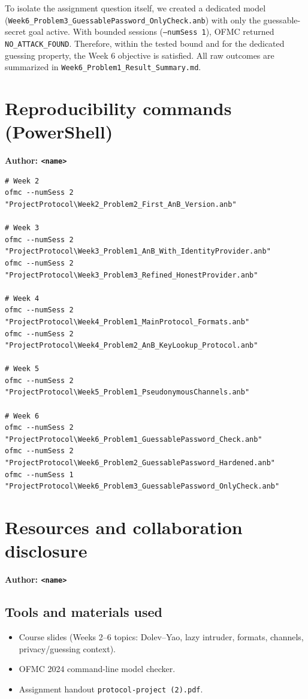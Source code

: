 \documentclass[11pt,a4paper]{article}
\begin{document}
To isolate the assignment question itself, we created a dedicated model
(\texttt{Week6\_Problem3\_GuessablePassword\_OnlyCheck.anb}) with only the guessable-secret goal active.
With bounded sessions (\texttt{--numSess 1}), OFMC returned \texttt{NO\_ATTACK\_FOUND}.
Therefore, within the tested bound and for the dedicated guessing property, the Week 6 objective is satisfied.
All raw outcomes are summarized in \texttt{Week6\_Problem1\_Result\_Summary.md}.

\section{Reproducibility commands (PowerShell)}
\textbf{Author: \texttt{<name>}}

\begin{lstlisting}
# Week 2
ofmc --numSess 2 "ProjectProtocol\Week2_Problem2_First_AnB_Version.anb"

# Week 3
ofmc --numSess 2 "ProjectProtocol\Week3_Problem1_AnB_With_IdentityProvider.anb"
ofmc --numSess 2 "ProjectProtocol\Week3_Problem3_Refined_HonestProvider.anb"

# Week 4
ofmc --numSess 2 "ProjectProtocol\Week4_Problem1_MainProtocol_Formats.anb"
ofmc --numSess 2 "ProjectProtocol\Week4_Problem2_AnB_KeyLookup_Protocol.anb"

# Week 5
ofmc --numSess 2 "ProjectProtocol\Week5_Problem1_PseudonymousChannels.anb"

# Week 6
ofmc --numSess 2 "ProjectProtocol\Week6_Problem1_GuessablePassword_Check.anb"
ofmc --numSess 2 "ProjectProtocol\Week6_Problem2_GuessablePassword_Hardened.anb"
ofmc --numSess 1 "ProjectProtocol\Week6_Problem3_GuessablePassword_OnlyCheck.anb"
\end{lstlisting}

\section{Resources and collaboration disclosure}
\textbf{Author: \texttt{<name>}}

\subsection*{Tools and materials used}
\begin{itemize}[leftmargin=1.2em]
  \item Course slides (Weeks 2--6 topics: Dolev--Yao, lazy intruder, formats, channels, privacy/guessing context).
  \item OFMC 2024 command-line model checker.
  \item Assignment handout \texttt{protocol-project (2).pdf}.
\end{itemize}
\end{document}
